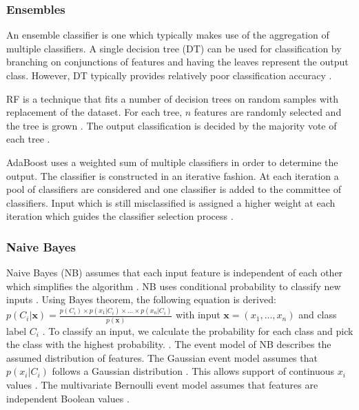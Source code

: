 \documentclass{sig-alternate-05-2015}
\begin{document}
	\subsubsection{Ensembles}
	An ensemble classifier is one which typically makes use of the aggregation of multiple classifiers. A single decision tree (DT) can be used for classification by branching on conjunctions of features and having the leaves represent the output class. However, DT typically provides relatively poor classification accuracy \cite{doi:10.1021/ci034160g}. 
	
	RF is a technique that fits a number of decision trees on random samples with replacement of the dataset. For each tree, $n$ features are randomly selected and the tree is grown \cite{WIDM:WIDM1072}. The output classification is decided by the majority vote of each tree \cite{WIDM:WIDM1072}.
	
	AdaBoost \cite{FREUND1997119} uses a weighted sum of multiple classifiers in order to determine the output. The classifier is constructed in an iterative fashion. At each iteration a pool of classifiers are considered and one classifier is added to the committee of classifiers. Input which is still misclassified is assigned a higher weight at each iteration which guides the classifier selection process \cite{Bergstra2006, rojas2009adaboost}.
	
	\subsubsection{Naive Bayes}
	Naive Bayes (NB) assumes that each input feature is independent of each other which simplifies the algorithm \cite{Lewis1998, rish2001empirical}. NB uses conditional probability to classify new inputs \cite{Lewis1998}. Using Bayes theorem, the following equation is derived: $p(C_i|\textbf{x}) = \frac{p(C_i) \times p(x_1|C_i) \times...\times p(x_n|C_i)}{p(\textbf{x})}$ with input $\textbf{x} = (x_1,...,x_n)$ and class label $C_i$ \cite{Lewis1998, rish2001empirical}. To classify an input, we calculate the probability for each class and pick the class with the highest probability. \cite{Lewis1998}. The event model of NB describes the assumed distribution of features. The Gaussian event model assumes that $p(x_i|C_i)$ follows a Gaussian distribution \cite{John:1995:ECD:2074158.2074196}. This allows support of continuous $x_i$ values \cite{John:1995:ECD:2074158.2074196}. The multivariate Bernoulli event model assumes that features are independent Boolean values \cite{mccallum1998comparison}.
	
\end{document}
